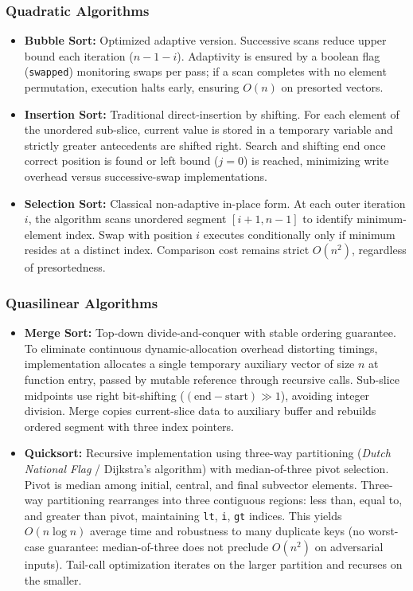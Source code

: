 \documentclass[namedate,webpdf,contemporary,large]{TBench-template}%
\theoremstyle{thmstyleone}%
\theoremstyle{thmstyletwo}%
\theoremstyle{thmstylethree}%
\begin{document}
\subsubsection{Quadratic Algorithms}
\begin{itemize}
\item \textbf{Bubble Sort:} Optimized adaptive version. Successive scans reduce upper bound each iteration ($n-1-i$). Adaptivity is ensured by a boolean flag (\texttt{swapped}) monitoring swaps per pass; if a scan completes with no element permutation, execution halts early, ensuring $O(n)$ on presorted vectors.
\item \textbf{Insertion Sort:} Traditional direct-insertion by shifting. For each element of the unordered sub-slice, current value is stored in a temporary variable and strictly greater antecedents are shifted right. Search and shifting end once correct position is found or left bound ($j=0$) is reached, minimizing write overhead versus successive-swap implementations.
\item \textbf{Selection Sort:} Classical non-adaptive in-place form. At each outer iteration $i$, the algorithm scans unordered segment $[i+1,n-1]$ to identify minimum-element index. Swap with position $i$ executes conditionally only if minimum resides at a distinct index. Comparison cost remains strict $O(n^2)$, regardless of presortedness.
\end{itemize}

\subsubsection{Quasilinear Algorithms}
\begin{itemize}
\item \textbf{Merge Sort:} Top-down divide-and-conquer with stable ordering guarantee. To eliminate continuous dynamic-allocation overhead distorting timings, implementation allocates a single temporary auxiliary vector of size $n$ at function entry, passed by mutable reference through recursive calls. Sub-slice midpoints use right bit-shifting ($(\text{end}-\text{start}) \gg 1$), avoiding integer division. Merge copies current-slice data to auxiliary buffer and rebuilds ordered segment with three index pointers.
\item \textbf{Quicksort:} Recursive implementation using three-way partitioning (\emph{Dutch National Flag} / Dijkstra's algorithm) with median-of-three pivot selection. Pivot is median among initial, central, and final subvector elements. Three-way partitioning rearranges into three contiguous regions: less than, equal to, and greater than pivot, maintaining \texttt{lt}, \texttt{i}, \texttt{gt} indices. This yields $O(n \log n)$ average time and robustness to many duplicate keys (no worst-case guarantee: median-of-three does not preclude $O(n^2)$ on adversarial inputs). Tail-call optimization iterates on the larger partition and recurses on the smaller.
\end{itemize}
\end{document}
